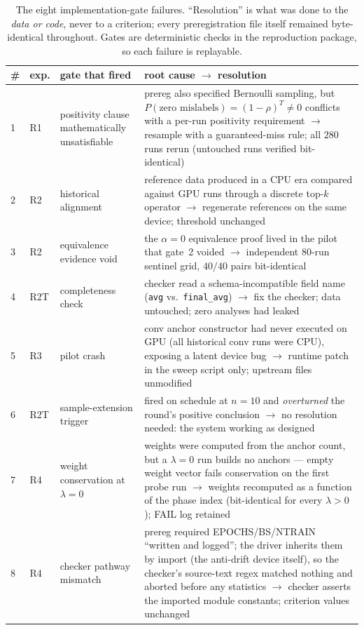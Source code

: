 \documentclass[10pt]{article}
\begin{document}
\begin{table}[t]
\centering
\caption{The eight implementation-gate failures. ``Resolution'' is what was
done to the \emph{data or code}, never to a criterion; every preregistration
file itself remained byte-identical throughout. Gates are deterministic
checks in the reproduction package, so each failure is replayable.}
\label{tab:gates}
\footnotesize
\setlength{\tabcolsep}{3.5pt}
\begin{tabular}{@{}llp{3.6cm}p{4.6cm}@{}}
\toprule
\# & exp. & gate that fired & root cause $\to$ resolution \\
\midrule
1 & R1 & positivity clause mathematically unsatisfiable &
prereg also specified Bernoulli sampling, but
$P(\text{zero mislabels}){=}(1-\rho)^T\!\neq\!0$ conflicts with a
per-run positivity requirement $\to$ resample with a
guaranteed-miss rule; all $280$ runs rerun (untouched runs verified
bit-identical) \\
2 & R2 & historical alignment &
reference data produced in a CPU era compared against GPU runs through a
discrete top-$k$ operator $\to$ regenerate references on the same device;
threshold unchanged \\
3 & R2 & equivalence evidence void &
the $\alpha{=}0$ equivalence proof lived in the pilot that gate~2 voided
$\to$ independent $80$-run sentinel grid, $40/40$ pairs bit-identical \\
4 & R2T & completeness check &
checker read a schema-incompatible field name
(\texttt{avg} vs.\ \texttt{final\_avg}) $\to$ fix the checker; data
untouched; zero analyses had leaked \\
5 & R3 & pilot crash &
conv anchor constructor had never executed on GPU (all historical conv
runs were CPU), exposing a latent device bug $\to$ runtime patch in the
sweep script only; upstream files unmodified \\
6 & R2T & sample-extension trigger &
fired on schedule at $n{=}10$ and \emph{overturned} the round's positive
conclusion $\to$ no resolution needed: the system working as designed \\
7 & R4 & weight conservation at $\lambda{=}0$ &
weights were computed from the anchor count, but a $\lambda{=}0$ run
builds no anchors --- empty weight vector fails conservation on the
first probe run $\to$ weights recomputed as a function of the phase
index (bit-identical for every $\lambda>0$); FAIL log retained \\
8 & R4 & checker pathway mismatch &
prereg required EPOCHS/BS/NTRAIN ``written and logged''; the driver
inherits them by import (the anti-drift device itself), so the checker's
source-text regex matched nothing and aborted before any statistics
$\to$ checker asserts the imported module constants; criterion values
unchanged \\
\bottomrule
\end{tabular}
\end{table}
\end{document}
